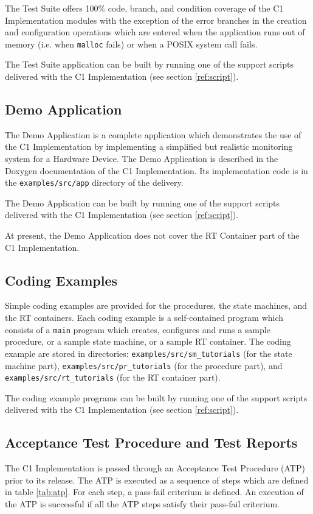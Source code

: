 \documentclass[manual]{../fwprofile}
\begin{document}
The Test Suite offers 100\% code, branch, and condition coverage of the C1 Implementation modules with the exception of the error branches in the creation and configuration operations which are entered when the application runs out of memory (i.e. when \texttt{malloc} fails) or when a POSIX system call fails.

The Test Suite application can be built by running one of the support scripts delivered with the C1 Implementation (see section \ref{ref:script}). 

\subsection{Demo Application}\label{sec:demoApp}
The Demo Application is a complete application which demonstrates the use of the C1 Implementation by implementing a simplified but realistic monitoring system for a Hardware Device. The Demo Application is described in the Doxygen documentation of the C1 Implementation. Its implementation code is in the \texttt{examples/src/app} directory of the delivery.

The Demo Application can be built by running one of the support scripts delivered with the C1 Implementation (see section \ref{ref:script}). 

At present, the Demo Application does not cover the RT Container part of the C1 Implementation.

\subsection{Coding Examples}\label{sec:codingExamples}
Simple coding examples are provided for the procedures, the state machines, and the RT containers. Each coding example is a self-contained program which consists of a \texttt{main} program which creates, configures and runs a sample procedure, or a sample state machine, or a sample RT container. The coding example are stored in directories: \texttt{examples/src/sm\_tutorials} (for the state machine part), \texttt{examples/src/pr\_tutorials} (for the procedure part), and \texttt{examples/src/rt\_tutorials} (for the RT container part).

The coding example programs can be built by running one of the support scripts delivered with the C1 Implementation (see section \ref{ref:script}). 

\subsection{Acceptance Test Procedure and Test Reports}\label{ref:atp}
The C1 Implementation is passed through an Acceptance Test Procedure (ATP) prior to its release. The ATP is executed as a sequence of steps which are defined in table \ref{tab:atp}. For each step, a pass-fail criterium is defined. An execution of the ATP is successful if all the ATP steps satisfy their pass-fail criterium.
\end{document}
